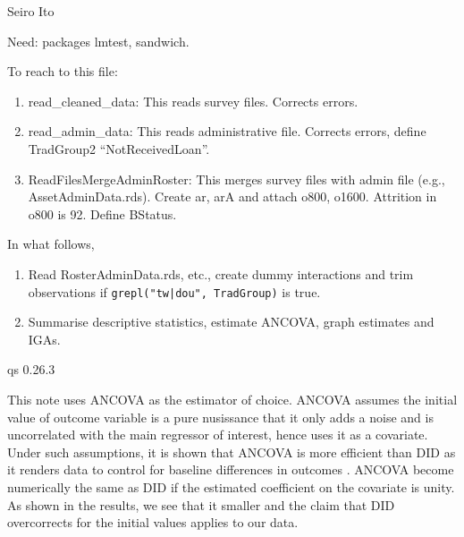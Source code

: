 \hfil Seiro Ito

\setcounter{tocdepth}{3}
\tableofcontents
\newpage

\setlength{\parindent}{1em}
\vspace{2ex}

Need: packages \textsf{lmtest, sandwich}.


To reach to this file:
\begin{enumerate}
\vspace{1.0ex}\setlength{\itemsep}{1.0ex}\setlength{\baselineskip}{12pt}
\item	read\_cleaned\_data: This reads survey files. Corrects errors.
\item	read\_admin\_data: This reads administrative file. Corrects errors, define \textsf{TradGroup2}  ``NotReceivedLoan''.
\item	ReadFilesMergeAdminRoster: This merges survey files with admin file (e.g., \textsf{AssetAdminData.rds}). Create \textsf{ar, arA} and attach \textsf{o800, o1600}. Attrition in \textsf{o800} is 92. Define \textsf{BStatus}.
\end{enumerate}

In what follows, 
\begin{enumerate}
\vspace{1.0ex}\setlength{\itemsep}{1.0ex}\setlength{\baselineskip}{12pt}
\item	Read RosterAdminData.rds, etc., create dummy interactions and trim observations if \verb+grepl("tw|dou", TradGroup)+ is true. 
\item	Summarise descriptive statistics, estimate ANCOVA, graph estimates and IGAs.
\end{enumerate}





\begin{Schunk}
\begin{Soutput}
qs 0.26.3
\end{Soutput}
\end{Schunk}



	This note uses ANCOVA as the estimator of choice. ANCOVA assumes the initial value of outcome variable is a pure nusissance that it only adds a noise and is uncorrelated with the main regressor of interest, hence uses it as a covariate. Under such assumptions, it is shown that ANCOVA is more efficient than DID as it renders data to control for baseline differences in outcomes \citep{FrisonPocock1992}. ANCOVA become numerically the same as DID if the estimated coefficient on the covariate is unity. As shown in the results, we see that it smaller and the claim that DID overcorrects for the initial values applies to our data.

